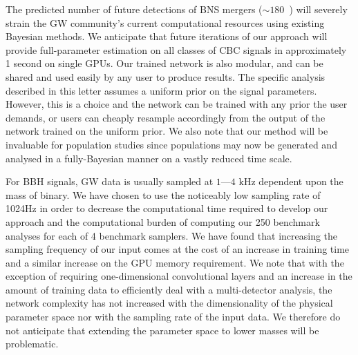 \documentclass[%
showpacs,
nofootinbib,
 amsmath,amssymb,
 aps,
 twocolumn,
 prl,
 reprint,
floatfix,
]{revtex4-1}
\begin{document}
%
%
The predicted number of future detections of \ac{BNS} mergers ($\sim
180$~\cite{2018LRR....21....3A}) will severely strain the \ac{GW} community's
current computational resources using existing Bayesian methods. We anticipate
that future iterations of our approach will provide full-parameter estimation
on all classes of \ac{CBC} signals in approximately 1 second on single
\acp{GPU}. Our trained network is also modular, and can be shared and used
easily by any user to produce results. The specific analysis described in this
letter assumes a uniform prior on the signal parameters. However, this is a
choice and the network can be trained with any prior the user demands, or users
can cheaply resample accordingly from the output of the network trained on the
uniform prior. We also note that our method will be invaluable for population
studies since populations may now be generated and analysed in a fully-Bayesian
manner on a vastly reduced time scale. 

%
%
For \ac{BBH} signals, \ac{GW} data is usually sampled at $1$---$4$ kHz
dependent upon the mass of binary. We have chosen to use the noticeably low
sampling rate of 1024Hz in order to decrease the computational time
required to develop our approach and the computational burden of computing our
250 benchmark analyses for each of 4 benchmark samplers.  We have found that 
increasing the sampling frequency of our input comes at the cost of an increase 
in training time and a similar increase on the \ac{GPU} memory
requirement. We note that with the exception of requiring one-dimensional
convolutional layers and an increase in the amount of training data to
efficiently deal with a multi-detector analysis, the network complexity has not
increased 
with the dimensionality of the physical parameter space nor with the
sampling rate of the input data. We therefore do not anticipate that extending
the parameter space to lower masses will be problematic. 
\end{document}
